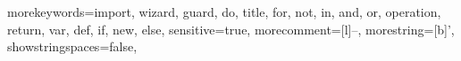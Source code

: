 {morekeywords={import, wizard, guard, do, title, for, not, in, and, or, operation, return, var, def, if, new, else},
sensitive=true,
morecomment=[l]{--},
morestring=[b]',
showstringspaces=false,
}
